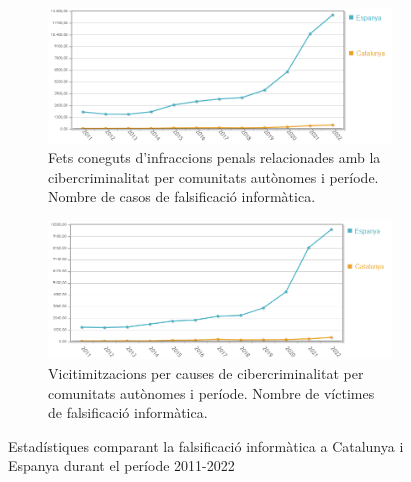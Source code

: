 \begin{figure}[H]
    \centering
    \begin{subfigure}[b]{0.8\textwidth}
      \includegraphics[width=\linewidth]{falsificacio.png}
      \caption{Fets coneguts d'infraccions penals relacionades amb la cibercriminalitat per comunitats autònomes i període. Nombre de casos de falsificació informàtica.}
      \label{fig:falsificacio}
    \end{subfigure}
  
    \vspace{1em} %
  
    \begin{subfigure}[b]{0.8\textwidth}
      \includegraphics[width=\linewidth]{victimes_falsificacio.png}
      \caption{Vicitimitzacions per causes de cibercriminalitat per comunitats autònomes i període. Nombre de víctimes de falsificació informàtica.}
      \label{fig:victimes_falsificacio}
    \end{subfigure}
    
    \caption{Estadístiques comparant la falsificació informàtica a Catalunya i Espanya durant el període 2011-2022}
    \label{fig:falsificacio_2}
\end{figure}

